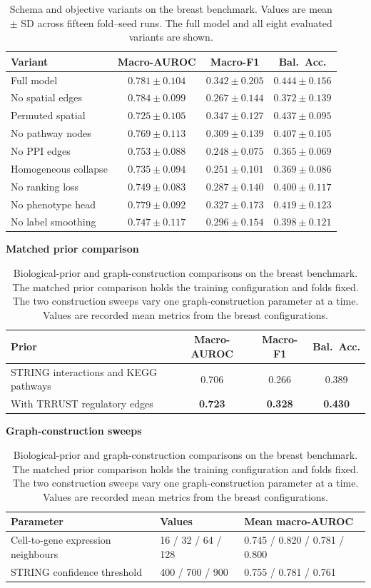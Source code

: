 \begin{table}[!ht]
\centering
\caption{Schema and objective variants on the breast benchmark. Values are mean $\pm$ SD
across fifteen fold--seed runs. The full model and all eight evaluated variants are shown.}
\label{tab:ablation}
\begin{tabularx}{\linewidth}{@{}Xccc@{}}
\toprule Variant & Macro-AUROC & Macro-F1 & Bal.\ Acc. \\
\midrule
Full model & $0.781\pm0.104$ & $0.342\pm0.205$ & $0.444\pm0.156$ \\
No spatial edges & $0.784\pm0.099$ & $0.267\pm0.144$ & $0.372\pm0.139$ \\
Permuted spatial & $0.725\pm0.105$ & $0.347\pm0.127$ & $0.437\pm0.095$ \\
No pathway nodes & $0.769\pm0.113$ & $0.309\pm0.139$ & $0.407\pm0.105$ \\
No PPI edges & $0.753\pm0.088$ & $0.248\pm0.075$ & $0.365\pm0.069$ \\
Homogeneous collapse & $0.735\pm0.094$ & $0.251\pm0.101$ & $0.369\pm0.086$ \\
No ranking loss & $0.749\pm0.083$ & $0.287\pm0.140$ & $0.400\pm0.117$ \\
No phenotype head & $0.779\pm0.092$ & $0.327\pm0.173$ & $0.419\pm0.123$ \\
No label smoothing & $0.747\pm0.117$ & $0.296\pm0.154$ & $0.398\pm0.121$ \\
\bottomrule
\end{tabularx}
\end{table}

\begin{table}[!ht]
\centering
\caption{Biological-prior and graph-construction comparisons on the breast benchmark.
The matched prior comparison holds the training configuration and folds fixed. The two
construction sweeps vary one graph-construction parameter at a time. Values are recorded
mean metrics from the breast configurations.}
\label{tab:prior_extensions}
\small
\textbf{Matched prior comparison}\\[4pt]
\begin{tabularx}{\linewidth}{@{}Xccc@{}}
\toprule Prior & Macro-AUROC & Macro-F1 & Bal.\ Acc. \\
\midrule
STRING interactions and KEGG pathways & 0.706 & 0.266 & 0.389 \\
With TRRUST regulatory edges & \textbf{0.723} & \textbf{0.328} & \textbf{0.430} \\
\bottomrule
\end{tabularx}
\medskip
\textbf{Graph-construction sweeps}\\[4pt]
\begin{tabularx}{\linewidth}{@{}Xll@{}}
\toprule Parameter & Values & Mean macro-AUROC \\
\midrule
Cell-to-gene expression neighbours & 16 / 32 / 64 / 128 & 0.745 / 0.820 / 0.781 / 0.800 \\
STRING confidence threshold & 400 / 700 / 900 & 0.755 / 0.781 / 0.761 \\
\bottomrule
\end{tabularx}
\end{table}

